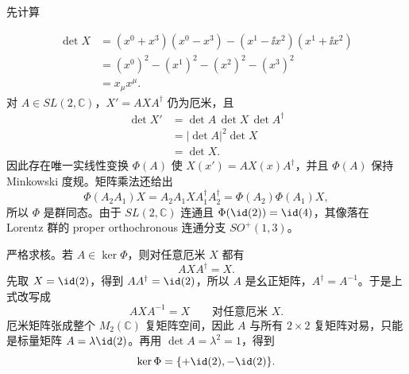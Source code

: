 \begin{derivation}
先计算

\begin{align*}
 \det X
 &=(x^0+x^3)(x^0-x^3)
 -(x^1-\ii x^2)(x^1+\ii x^2)\\
 &=(x^0)^2-(x^1)^2-(x^2)^2-(x^3)^2\\
 &=x_\mu x^\mu.
\end{align*}
对 $A\in SL(2,\mathbb C)$，$X'=AXA^\dagger$ 仍为厄米，且
\begin{align*}
 \det X'
 &=\det A\,\det X\,\det A^\dagger\\
 &=|\det A|^2\det X\\
 &=\det X.
\end{align*}
因此存在唯一实线性变换 $\Phi(A)$ 使 $X(x')=AX(x)A^\dagger$，并且 $\Phi(A)$ 保持 Minkowski 度规。矩阵乘法还给出
\begin{equation*}
 \Phi(A_2A_1)X
 =A_2A_1X A_1^\dagger A_2^\dagger
 =\Phi(A_2)\Phi(A_1)X,
\end{equation*}
所以 $\Phi$ 是群同态。由于 $SL(2,\mathbb C)$ 连通且 $\Phi(\id(2))=\id(4)$，其像落在 Lorentz 群的 proper orthochronous 连通分支 $SO^+(1,3)$。

严格求核。若 $A\in\ker\Phi$，则对任意厄米 $X$ 都有
\begin{equation*}
 AXA^\dagger=X.
\end{equation*}
先取 $X=\id(2)$，得到 $AA^\dagger=\id(2)$，所以 $A$ 是幺正矩阵，$A^\dagger=A^{-1}$。于是上式改写成
\begin{equation*}
 AXA^{-1}=X
 \qquad\text{对任意厄米 }X.
\end{equation*}
厄米矩阵张成整个 $M_2(\mathbb C)$ 复矩阵空间，因此 $A$ 与所有 $2\times2$ 复矩阵对易，只能是标量矩阵 $A=\lambda\id(2)$。再用 $\det A=\lambda^2=1$，得到
\begin{equation*}
 \ker\Phi=\{+\id(2),-\id(2)\}.
\end{equation*}


\end{derivation}
